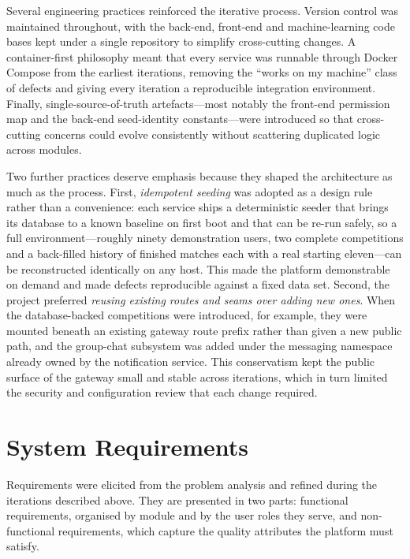 Several engineering practices reinforced the iterative process. Version control was
maintained throughout, with the back-end, front-end and machine-learning code bases
kept under a single repository to simplify cross-cutting changes. A
container-first philosophy meant that every service was runnable through Docker
Compose from the earliest iterations, removing the ``works on my machine'' class of
defects and giving every iteration a reproducible integration environment. Finally,
single-source-of-truth artefacts---most notably the front-end permission map and the
back-end seed-identity constants---were introduced so that cross-cutting concerns
could evolve consistently without scattering duplicated logic across modules.

Two further practices deserve emphasis because they shaped the architecture as much
as the process. First, \emph{idempotent seeding} was adopted as a design rule rather
than a convenience: each service ships a deterministic seeder that brings its
database to a known baseline on first boot and that can be re-run safely, so a full
environment---roughly ninety demonstration users, two complete competitions and a
back-filled history of finished matches each with a real starting eleven---can be
reconstructed identically on any host. This made the platform demonstrable on demand
and made defects reproducible against a fixed data set. Second, the project preferred
\emph{reusing existing routes and seams over adding new ones}. When the
database-backed competitions were introduced, for example, they were mounted beneath
an existing gateway route prefix rather than given a new public path, and the
group-chat subsystem was added under the messaging namespace already owned by the
notification service. This conservatism kept the public surface of the gateway small
and stable across iterations, which in turn limited the security and configuration
review that each change required.

\section{System Requirements}
\label{sec:requirements}

Requirements were elicited from the problem analysis and refined during the iterations
described above. They are presented in two parts: functional requirements, organised
by module and by the user roles they serve, and non-functional requirements, which
capture the quality attributes the platform must satisfy.

